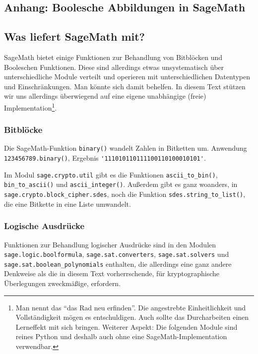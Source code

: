 \begin{refsegment}
\section{Anhang: Boolesche Abbildungen in SageMath}\label{a-bool-sage}
\subsection{Was liefert SageMath mit?}

SageMath bietet einige Funktionen zur Behandlung von Bitblöcken
und Booleschen Funktionen.
Diese sind allerdings etwas unsystematisch über unterschiedliche Module
verteilt und operieren mit unterschiedlichen Datentypen und Einschränkungen.
Man könnte sich damit behelfen. In diesem Text stützen wir uns allerdings
überwiegend auf eine eigene unabhängige (freie) Implementation\footnote{%
   Man nennt das "`das Rad neu erfinden"'. Die angestrebte Einheitlichkeit
   und Vollständigkeit mögen es entschuldigen. Auch sollte das Durcharbeiten
   einen Lerneffekt mit sich bringen. Weiterer Aspekt:
   Die folgenden Module sind reines Python und deshalb auch ohne eine
   SageMath-Implementation verwendbar.
}.

\subsubsection*{Bitblöcke}

Die SageMath-Funktion \verb:binary(): wandelt Zahlen in
Bitketten um. Anwendung \verb:123456789.binary():,
Ergebnis \verb:'111010110111100110100010101':.

Im Modul \verb:sage.crypto.util: gibt es die Funktionen \verb:ascii_to_bin():,
\verb:bin_to_ascii(): und \verb:ascii_integer():. Außerdem gibt es ganz
woanders, in \verb:sage.crypto.block_cipher.sdes:, noch die Funktion
\verb:sdes.string_to_list():, die eine Bitkette in eine Liste umwandelt.

\subsubsection*{Logische Ausdrücke}

Funktionen zur Behandlung logischer
Ausdrücke
sind in den Modulen
\verb:sage.logic.boolformula:,
\verb:sage.sat.converters:,
\verb:sage.sat.solvers: und
\verb:sage.sat.boolean_polynomials:
enthalten, die allerdings eine ganz andere Denkweise als die in
diesem Text vorherrschende, für kryptographische Überlegungen
zweckmäßige, erfordern.


\end{refsegment}
